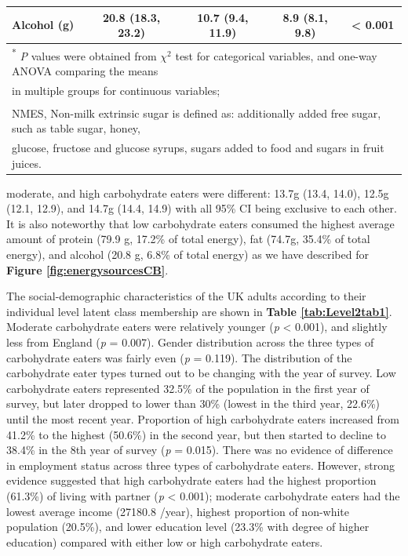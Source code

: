 \begin{table}[H]
\begin{tabular}[t]{lcccc}
		Alcohol (g) & 20.8 (18.3, 23.2) & 10.7 (9.4, 11.9) & 8.9 (8.1, 9.8) & < 0.001\\
		\bottomrule
		\multicolumn{5}{l}{{\scriptsize \textsuperscript{*} \textit{P} values were obtained from $\chi^2$ test for categorical variables, and one-way ANOVA comparing the means}}\\
		\multicolumn{5}{l}{{\scriptsize  in multiple groups for continuous variables;}}\\
		\multicolumn{5}{l}{\textsuperscript{\dag} NMES, Non-milk extrinsic sugar is defined as: additionally added free sugar, such as table sugar, honey, }\\
		\multicolumn{5}{l}{{\scriptsize glucose, fructose and glucose syrups, sugars added to food and sugars in fruit juices.}}\\
	\end{tabular}
\end{table}


moderate, and high carbohydrate eaters were different: 13.7g (13.4, 14.0), 12.5g (12.1, 12.9), and 14.7g (14.4, 14.9) with all 95\% CI being exclusive to each other. It is also noteworthy that low carbohydrate eaters consumed the highest average amount of protein (79.9 g, 17.2\% of total energy), fat (74.7g, 35.4\% of total energy), and alcohol (20.8 g, 6.8\% of total energy) as we have described for \textbf{Figure \ref{fig:energysourcesCB}}. 
 
The social-demographic characteristics of the UK adults according to their individual level latent class membership are shown in \textbf{Table \ref{tab:Level2tab1}}. Moderate carbohydrate eaters were relatively younger (\textit{p} < 0.001), and slightly less from England (\textit{p} = 0.007). Gender distribution across the three types of carbohydrate eaters was fairly even (\textit{p} = 0.119). The distribution of the carbohydrate eater types turned out to be changing with the year of survey. Low carbohydrate eaters represented 32.5\% of the population in the first year of survey, but later dropped to lower than 30\% (lowest in the third year, 22.6\%) until the most recent year. Proportion of high carbohydrate eaters increased from 41.2\% to the highest (50.6\%) in the second year, but then started to decline to 38.4\% in the 8th year of survey (\textit{p} = 0.015). There was no evidence of difference in employment status across three types of carbohydrate eaters. However, strong evidence suggested that high carbohydrate eaters had the highest proportion (61.3\%) of living with partner (\textit{p} < 0.001); moderate carbohydrate eaters had the lowest average income (27180.8 \textsterling/year), highest proportion of non-white population (20.5\%), and lower education level (23.3\% with degree of higher education) compared with either low or high carbohydrate eaters. 


